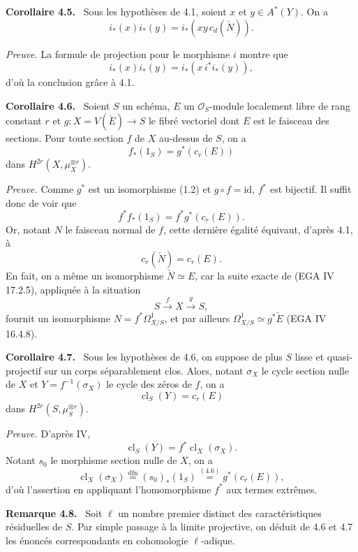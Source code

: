 \documentclass[11pt]{article}
\newenvironment{statement}[1]{\par\medskip\noindent\textbf{#1.}\ }{\par\medskip}
\providecommand{\cl}{\operatorname{cl}}
\providecommand{\cl}{\operatorname{cl}}
\begin{document}
\begin{statement}{Corollaire 4.5}
Sous les hypothèses de 4.1, soient $x$ et $y\in A^*(Y)$. On a
\[
i_*(x)i_*(y)=i_*(xy\,c_d(\check N)).
\]
\end{statement}

\emph{Preuve.} La formule de projection pour le morphisme $i$ montre que
\[
i_*(x)i_*(y)=i_*(x\,i^*i_*(y)),
\]
d'où la conclusion grâce à 4.1.

\begin{statement}{Corollaire 4.6}
Soient $S$ un schéma, $E$ un $\mathcal O_S$-module localement libre de rang constant $r$ et $g:X=V(\check E)\to S$ le fibré vectoriel dont $E$ est le faisceau des sections. Pour toute section $f$ de $X$ au-dessus de $S$, on a
\[
f_*(1_S)=g^*(c_r(E))
\]
dans $H^{2r}(X,\mu_X^{\otimes r})$.
\end{statement}

\emph{Preuve.} Comme $g^*$ est un isomorphisme (1.2) et $g\circ f=\mathrm{id}$, $f^*$ est bijectif. Il suffit donc de voir que
\[
f^*f_*(1_S)=f^*g^*(c_r(E)).
\]
Or, notant $N$ le faisceau normal de $f$, cette dernière égalité équivaut, d'après 4.1, à
\[
c_r(\check N)=c_r(E).
\]
En fait, on a même un isomorphisme $\check N\simeq E$, car la suite exacte de (EGA IV 17.2.5), appliquée à la situation
\[
S\xrightarrow{f} X\xrightarrow{g} S,
\]
fournit un isomorphisme $N=f^*\Omega^1_{X/S}$, et par ailleurs $\Omega^1_{X/S}\simeq g^*\check E$ (EGA IV 16.4.8).

\begin{statement}{Corollaire 4.7}
Sous les hypothèses de 4.6, on suppose de plus $S$ lisse et quasi-projectif sur un corps séparablement clos. Alors, notant $\sigma_X$ le cycle section nulle de $X$ et $Y=f^{-1}(\sigma_X)$ le cycle des zéros de $f$, on a
\[
\cl_S(Y)=c_r(E)
\]
dans $H^{2r}(S,\mu_S^{\otimes r})$.
\end{statement}

\emph{Preuve.} D'après IV,
\[
\cl_S(Y)=f^*\cl_X(\sigma_X).
\]
Notant $s_0$ le morphisme section nulle de $X$, on a
\[
\cl_X(\sigma_X)\stackrel{\mathrm{dfn}}{=}(s_0)_*(1_S)\stackrel{(4.6)}{=}g^*(c_r(E)),
\]
d'où l'assertion en appliquant l'homomorphisme $f^*$ aux termes extrêmes.

\begin{statement}{Remarque 4.8}
Soit $\ell$ un nombre premier distinct des caractéristiques résiduelles de $S$. Par simple passage à la limite projective, on déduit de 4.6 et 4.7 les énoncés correspondants en cohomologie $\ell$-adique.
\end{statement}
\end{document}
